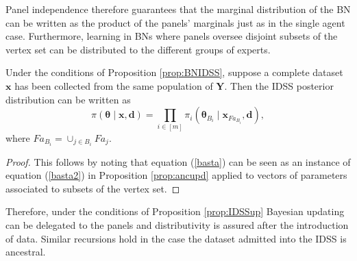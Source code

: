 Panel independence therefore guarantees that the marginal distribution of the BN can be written as the product of the panels' marginals just as in the single agent case. Furthermore, learning in BNs where panels oversee disjoint subsets of the vertex set can be distributed to the different groups of experts.
\begin{proposition}
\label{prop:IDSSup}
Under the conditions of Proposition \ref{prop:BNIDSS}, suppose a complete dataset $\bm{x}$ has been collected from the same population of $\bm{Y}$. Then the IDSS posterior distribution can be written as
\begin{equation}
\label{basta}
\pi(\bm{\theta}\;|\;\bm{x},\bm{d})=\prod_{i\in[m]}\pi_i(\bm{\theta}_{B_i}\;|\;\bm{x}_{Fa_{B_i}},\bm{d}),
\end{equation} 
where $Fa_{B_i}=\cup_{j\in B_i}Fa_j$.
\end{proposition}
\begin{proof}
This follows by noting that equation (\ref{basta}) can be seen as an instance of equation (\ref{basta2}) in Proposition \ref{prop:ancupd} applied to vectors of parameters associated to subsets of the vertex set.
\end{proof}


Therefore, under the conditions of Proposition \ref{prop:IDSSup} Bayesian updating can be delegated to the panels and distributivity is assured after the introduction of data. Similar recursions hold in the case the dataset admitted into the IDSS is ancestral. 

